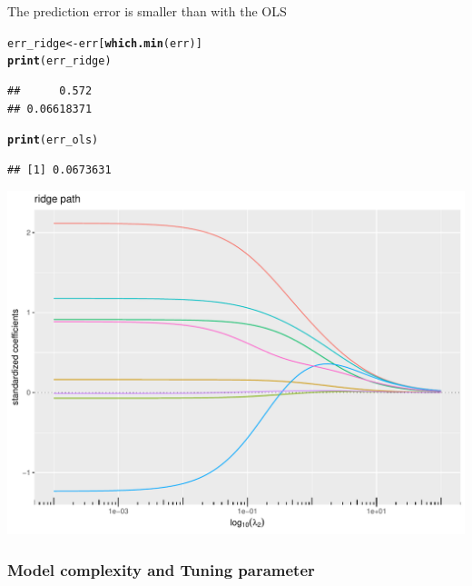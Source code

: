 \documentclass[10pt, c, xcolor=x11names]{beamer}\usepackage[]{graphicx}\usepackage[]{color}
\makeatletter
\newcommand{\hlstd}[1]{\textcolor[rgb]{0.345,0.345,0.345}{#1}}%
\newcommand{\hlkwb}[1]{\textcolor[rgb]{0.69,0.353,0.396}{#1}}%
\newcommand{\hlkwd}[1]{\textcolor[rgb]{0.737,0.353,0.396}{\textbf{#1}}}%
\newenvironment{kframe}{%
 \def\at@end@of@kframe{}%
 \ifinner\ifhmode%
  \def\at@end@of@kframe{\end{minipage}}%
  \begin{minipage}{\columnwidth}%
 \fi\fi%
 \def\FrameCommand##1{\hskip\@totalleftmargin \hskip-\fboxsep
 \colorbox{shadecolor}{##1}\hskip-\fboxsep
     \hskip-\linewidth \hskip-\@totalleftmargin \hskip\columnwidth}%
 \MakeFramed {\advance\hsize-\width
   \@totalleftmargin\z@ \linewidth\hsize
   \@setminipage}}%
 {\par\unskip\endMakeFramed%
 \at@end@of@kframe}
\newenvironment{knitrout}{}{} %
\makeatother
\begin{document}
\begin{frame}[containsverbatim]
The prediction error is smaller than with the OLS
\begin{knitrout}\scriptsize
{}\color{fgcolor}\begin{kframe}
\begin{alltt}
\hlstd{err_ridge} \hlkwb{<-} \hlstd{err[}\hlkwd{which.min}\hlstd{(err)]}
\hlkwd{print}\hlstd{(err_ridge)}
\end{alltt}
\begin{verbatim}
##      0.572 
## 0.06618371
\end{verbatim}
\begin{alltt}
\hlkwd{print}\hlstd{(err_ols)}
\end{alltt}
\begin{verbatim}
## [1] 0.0673631
\end{verbatim}
\end{kframe}
\end{knitrout}

\end{frame}

\begin{frame}[containsverbatim]
\begin{knitrout}\scriptsize
{}\color{fgcolor}
\includegraphics[width=.8\textwidth]{figures/ridgerdige_path_prostate-1} 

\end{knitrout}
\end{frame}


\subsubsection{Model complexity and Tuning parameter}
\end{document}
